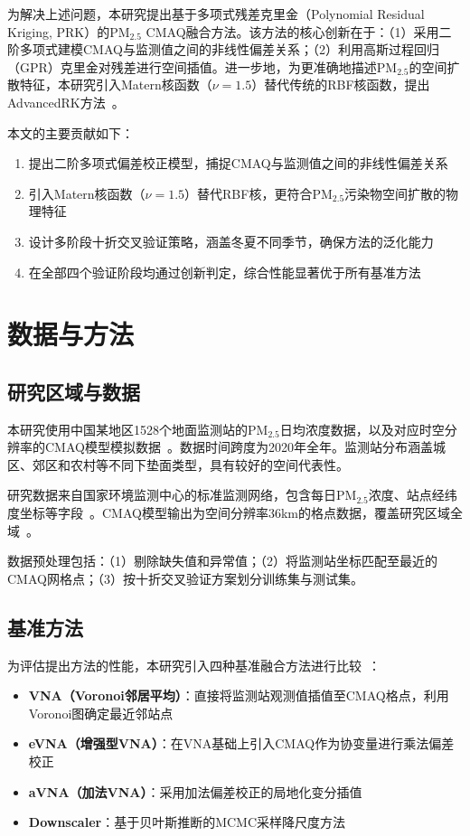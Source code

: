 \documentclass[UTF8, a4paper, 12pt]{article}
\begin{document}
为解决上述问题，本研究提出基于多项式残差克里金（Polynomial Residual Kriging, PRK）的PM$_{2.5}$ CMAQ融合方法。该方法的核心创新在于：（1）采用二阶多项式建模CMAQ与监测值之间的非线性偏差关系；（2）利用高斯过程回归（GPR）克里金对残差进行空间插值。进一步地，为更准确地描述PM$_{2.5}$的空间扩散特征，本研究引入Matern核函数（$\nu=1.5$）替代传统的RBF核函数，提出AdvancedRK方法~\cite{rasmussen2006gaussian}。

本文的主要贡献如下：
\begin{enumerate}
    \item 提出二阶多项式偏差校正模型，捕捉CMAQ与监测值之间的非线性偏差关系
    \item 引入Matern核函数（$\nu=1.5$）替代RBF核，更符合PM$_{2.5}$污染物空间扩散的物理特征
    \item 设计多阶段十折交叉验证策略，涵盖冬夏不同季节，确保方法的泛化能力
    \item 在全部四个验证阶段均通过创新判定，综合性能显著优于所有基准方法
\end{enumerate}

\section{数据与方法}

\subsection{研究区域与数据}

本研究使用中国某地区1528个地面监测站的PM$_{2.5}$日均浓度数据，以及对应时空分辨率的CMAQ模型模拟数据~\cite{foley2010CMAQ}。数据时间跨度为2020年全年。监测站分布涵盖城区、郊区和农村等不同下垫面类型，具有较好的空间代表性。

研究数据来自国家环境监测中心的标准监测网络，包含每日PM$_{2.5}$浓度、站点经纬度坐标等字段~\cite{chang2015outlier}。CMAQ模型输出为空间分辨率36km的格点数据，覆盖研究区域全域~\cite{rodriguez2025downscaling}。

数据预处理包括：（1）剔除缺失值和异常值；（2）将监测站坐标匹配至最近的CMAQ网格点；（3）按十折交叉验证方案划分训练集与测试集。

\subsection{基准方法}

为评估提出方法的性能，本研究引入四种基准融合方法进行比较~\cite{liu2019spatial}：

\begin{itemize}
    \item \textbf{VNA（Voronoi邻居平均）}：直接将监测站观测值插值至CMAQ格点，利用Voronoi图确定最近邻站点~\cite{singh2019enhanced}

    \item \textbf{eVNA（增强型VNA）}：在VNA基础上引入CMAQ作为协变量进行乘法偏差校正

    \item \textbf{aVNA（加法VNA）}：采用加法偏差校正的局地化变分插值

    \item \textbf{Downscaler}：基于贝叶斯推断的MCMC采样降尺度方法~\cite{rodriguez2025downscaling}
\end{itemize}
\end{document}
